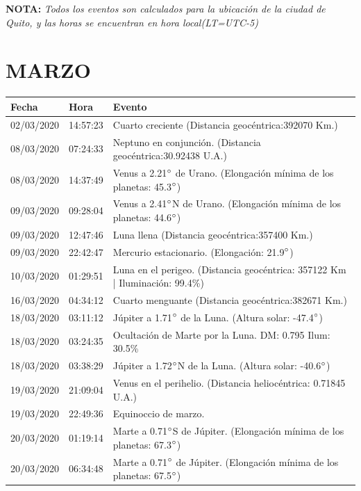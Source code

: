 \documentclass[12pt,a4paper,oneside]{article}
\begin{document}
\vspace{1cm}
\textbf{NOTA:  }\textit{Todos los eventos son calculados para la ubicaci\'on de la ciudad de Quito, y las horas se encuentran en hora local(LT=UTC-5)}
\vspace{0.7cm}
\newpage
\section{MARZO}
\begin{center}
\begin{tabular}{ |l| l| l| }
\hline
 \textbf{Fecha} & \textbf{Hora} & \textbf{Evento}\\
 \hline
02/03/2020 &  14:57:23   &  Cuarto creciente (Distancia geocéntrica:392070 Km.)	  \\
08/03/2020 &  07:24:33   &  Neptuno en conjunción. (Distancia geocéntrica:30.92438 U.A.)	  \\
08/03/2020 &  14:37:49   &  Venus a 2.21$\degree$ de Urano. (Elongación mínima de los planetas: 45.3$\degree$)	  \\
09/03/2020 &  09:28:04   &  Venus a 2.41$\degree$N de Urano. (Elongación mínima de los planetas: 44.6$\degree$)	  \\
09/03/2020 &  12:47:46   &  Luna llena (Distancia geocéntrica:357400 Km.)	  \\
09/03/2020 &  22:42:47   &  Mercurio estacionario. (Elongación: 21.9$\degree$)	  \\
10/03/2020 &  01:29:51   &  Luna en el perigeo. (Distancia geocéntrica: 357122 Km | Iluminación: 99.4\%)	  \\
16/03/2020 &  04:34:12   &  Cuarto menguante (Distancia geocéntrica:382671 Km.)	  \\
18/03/2020 &  03:11:12   &  Júpiter a 1.71$\degree$ de la Luna. (Altura solar: -47.4$\degree$)	  \\
18/03/2020 &  03:24:35   &  Ocultación de Marte por la Luna. DM: 0.795 Ilum: 30.5\%	  \\
18/03/2020 &  03:38:29   &  Júpiter a 1.72$\degree$N de la Luna. (Altura solar: -40.6$\degree$)	  \\
19/03/2020 &  21:09:04   &  Venus en el perihelio. (Distancia heliocéntrica: 0.71845 U.A.)	  \\
19/03/2020 &  22:49:36   &  Equinoccio de marzo.	  \\
20/03/2020 &  01:19:14   &  Marte a 0.71$\degree$S de Júpiter. (Elongación mínima de los planetas: 67.3$\degree$)	  \\
20/03/2020 &  06:34:48   &  Marte a 0.71$\degree$ de Júpiter. (Elongación mínima de los planetas: 67.5$\degree$)	  \\

\end{tabular}
\end{center}
\end{document}
